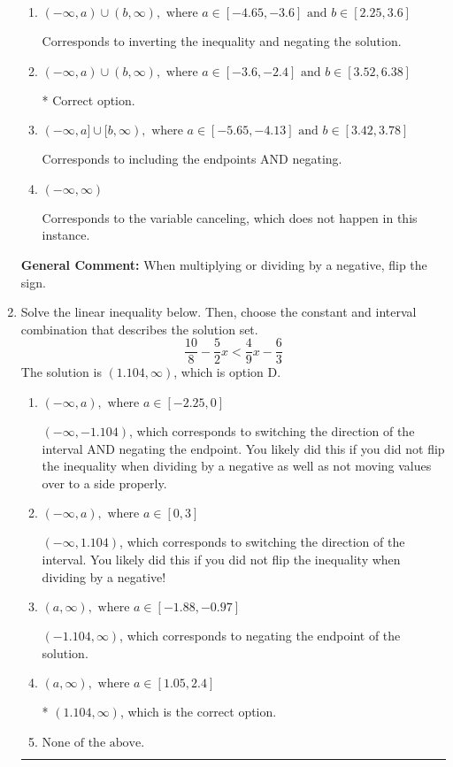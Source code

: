 \documentclass{extbook}[14pt]
\newcommand{\litem}[1]{\item #1

\rule{\textwidth}{0.4pt}}
\begin{document}
\begin{enumerate}
{\begin{enumerate}[label=\Alph*.]
Corresponds to including the endpoints (when they should be excluded).
\item \( (-\infty, a) \cup (b, \infty), \text{ where } a \in [-4.65, -3.6] \text{ and } b \in [2.25, 3.6] \)

Corresponds to inverting the inequality and negating the solution.
\item \( (-\infty, a) \cup (b, \infty), \text{ where } a \in [-3.6, -2.4] \text{ and } b \in [3.52, 6.38] \)

 * Correct option.
\item \( (-\infty, a] \cup [b, \infty), \text{ where } a \in [-5.65, -4.13] \text{ and } b \in [3.42, 3.78] \)

Corresponds to including the endpoints AND negating.
\item \( (-\infty, \infty) \)

Corresponds to the variable canceling, which does not happen in this instance.
\end{enumerate}

\textbf{General Comment:} When multiplying or dividing by a negative, flip the sign.
}
\litem{
Solve the linear inequality below. Then, choose the constant and interval combination that describes the solution set.
\[ \frac{10}{8} - \frac{5}{2} x < \frac{4}{9} x - \frac{6}{3} \]The solution is \( (1.104, \infty) \), which is option D.\begin{enumerate}[label=\Alph*.]
\item \( (-\infty, a), \text{ where } a \in [-2.25, 0] \)

 $(-\infty, -1.104)$, which corresponds to switching the direction of the interval AND negating the endpoint. You likely did this if you did not flip the inequality when dividing by a negative as well as not moving values over to a side properly.
\item \( (-\infty, a), \text{ where } a \in [0, 3] \)

 $(-\infty, 1.104)$, which corresponds to switching the direction of the interval. You likely did this if you did not flip the inequality when dividing by a negative!
\item \( (a, \infty), \text{ where } a \in [-1.88, -0.97] \)

 $(-1.104, \infty)$, which corresponds to negating the endpoint of the solution.
\item \( (a, \infty), \text{ where } a \in [1.05, 2.4] \)

* $(1.104, \infty)$, which is the correct option.
\item \( \text{None of the above}. \)


\end{enumerate}}
\end{enumerate}
\end{document}
